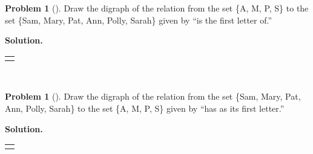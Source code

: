 \documentclass[10pt,]{book}
\theoremstyle{plain}
\theoremstyle{definition}
\newtheorem{activity}[project]{Problem}
\theoremstyle{definition}
\numberwithin{equation}{chapter}
\newlength{\panelmax}
\begin{document}
\begin{activity}[]\label{initialdigraph}
Draw the digraph of the relation from the set \{A, M, P, S\} to the set \{Sam, Mary, Pat, Ann, Polly, Sarah\} given by ``is the first letter of.''%
\par\medskip\noindent%
\textbf{Solution.}\quad %
{%
\setlength{\panelmax}{0pt}
\newsavebox{\panelboxASimage}
\newlength{\phASimage}\setlength{\phASimage}{\ht\panelboxASimage+\dp\panelboxASimage}
\settototalheight{\phASimage}{\usebox{\panelboxASimage}}
\setlength{\panelmax}{\maxof{\panelmax}{\phASimage}}
\leavevmode%
\setlength{\tabcolsep}{0\linewidth}
\par\medskip\noindent
\hspace*{0.25\linewidth}%
\begin{tabular}{@{}*{1}{c}@{}}
\begin{minipage}[c][\panelmax][t]{0.5\linewidth}\usebox{\panelboxASimage}\end{minipage}\end{tabular}\\
}%
\end{activity}
\begin{activity}[]\label{initialdigraph2}
Draw the digraph of the relation from the set \{Sam, Mary, Pat, Ann, Polly, Sarah\} to the set \{A, M, P, S\} given by ``has as its first letter.''%
\par\medskip\noindent%
\textbf{Solution.}\quad %
{%
\setlength{\panelmax}{0pt}
\newsavebox{\panelboxATimage}
\newlength{\phATimage}\setlength{\phATimage}{\ht\panelboxATimage+\dp\panelboxATimage}
\settototalheight{\phATimage}{\usebox{\panelboxATimage}}
\setlength{\panelmax}{\maxof{\panelmax}{\phATimage}}
\leavevmode%
\setlength{\tabcolsep}{0\linewidth}
\par\medskip\noindent
\hspace*{0.25\linewidth}%
\begin{tabular}{@{}*{1}{c}@{}}
\begin{minipage}[c][\panelmax][t]{0.5\linewidth}\usebox{\panelboxATimage}\end{minipage}\end{tabular}\\
}%
\end{activity}
\end{document}

